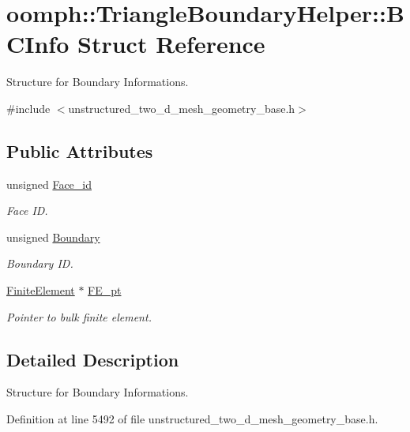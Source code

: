 \hypertarget{structoomph_1_1TriangleBoundaryHelper_1_1BCInfo}{}\section{oomph\+:\+:Triangle\+Boundary\+Helper\+:\+:B\+C\+Info Struct Reference}
\label{structoomph_1_1TriangleBoundaryHelper_1_1BCInfo}


Structure for Boundary Informations.  




{\ttfamily \#include $<$unstructured\+\_\+two\+\_\+d\+\_\+mesh\+\_\+geometry\+\_\+base.\+h$>$}

\subsection*{Public Attributes}
\begin{DoxyCompactItemize}
\item 
unsigned \hyperlink{structoomph_1_1TriangleBoundaryHelper_1_1BCInfo_af1ecd57ea7e0cbb2f9a1bfe11dfec565}{Face\+\_\+id}
\begin{DoxyCompactList}\small\item\em Face ID. \end{DoxyCompactList}\item 
unsigned \hyperlink{structoomph_1_1TriangleBoundaryHelper_1_1BCInfo_ad8088be156a93342df04702405cb3225}{Boundary}
\begin{DoxyCompactList}\small\item\em Boundary ID. \end{DoxyCompactList}\item 
\hyperlink{classoomph_1_1FiniteElement}{Finite\+Element} $\ast$ \hyperlink{structoomph_1_1TriangleBoundaryHelper_1_1BCInfo_a263292ad2a54d23d077ec612d52ddde6}{F\+E\+\_\+pt}
\begin{DoxyCompactList}\small\item\em Pointer to bulk finite element. \end{DoxyCompactList}\end{DoxyCompactItemize}


\subsection{Detailed Description}
Structure for Boundary Informations. 

Definition at line 5492 of file unstructured\+\_\+two\+\_\+d\+\_\+mesh\+\_\+geometry\+\_\+base.\+h.



